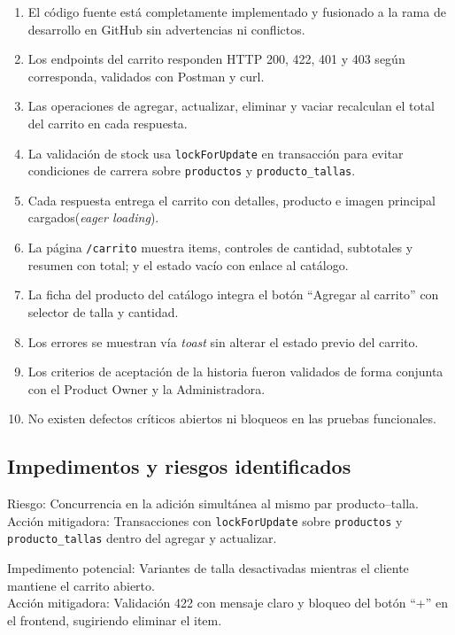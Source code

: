 \documentclass[12pt,a4paper]{article}
\begin{document}
\begin{enumerate}
    \item El código fuente está completamente implementado y fusionado a la rama de desarrollo en GitHub sin advertencias ni conflictos.
    \item Los endpoints del carrito responden HTTP 200, 422, 401 y 403 según corresponda, validados con Postman y curl.
    \item Las operaciones de agregar, actualizar, eliminar y vaciar recalculan el total del carrito en cada respuesta.
    \item La validación de stock usa \texttt{lockForUpdate} en transacción para evitar condiciones de carrera sobre \texttt{productos} y \texttt{producto\_tallas}.
    \item Cada respuesta entrega el carrito con detalles, producto e imagen principal cargados(\textit{eager loading}).
    \item La página \texttt{/carrito} muestra items, controles de cantidad, subtotales y resumen con total; y el estado vacío con enlace al catálogo.
    \item La ficha del producto del catálogo integra el botón ``Agregar al carrito'' con selector de talla y cantidad.
    \item Los errores se muestran vía \textit{toast} sin alterar el estado previo del carrito.
    \item Los criterios de aceptación de la historia fueron validados de forma conjunta con el Product Owner y la Administradora.
    \item No existen defectos críticos abiertos ni bloqueos en las pruebas funcionales.
\end{enumerate}

\subsection*{Impedimentos y riesgos identificados}

Riesgo: Concurrencia en la adición simultánea al mismo par producto--talla.\\
Acción mitigadora: Transacciones con \texttt{lockForUpdate} sobre \texttt{productos} y \texttt{producto\_tallas} dentro del agregar y actualizar.

Impedimento potencial: Variantes de talla desactivadas mientras el cliente mantiene el carrito abierto.\\
Acción mitigadora: Validación 422 con mensaje claro y bloqueo del botón ``+'' en el frontend, sugiriendo eliminar el item.
\end{document}
